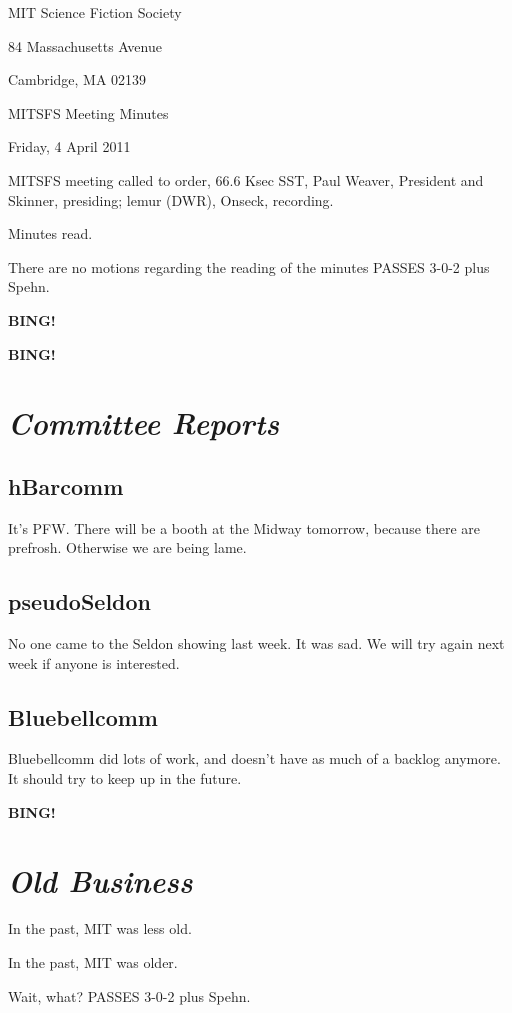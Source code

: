 \documentclass[10pt]{article}
\newcommand{\bing}{{\bf BING!} }
\newcommand{\goto}[1]{\bing \vskip 12pt \section*{{\em{#1}}}}
\newcommand{\ps}{ plus Spehn\xspace}
\newcommand{\skinner}{Paul Weaver, President and Skinner}
\newcommand{\onseck}{lemur (DWR), Onseck}
\newcommand{\meetingdate}{Friday, 4 April 2011}
\begin{document}
\begin{center}

MIT Science Fiction Society

84 Massachusetts Avenue

Cambridge, MA 02139

\vspace{12pt}

MITSFS Meeting Minutes

\meetingdate

\end{center}

\vspace{18pt}

\setlength{\parskip}{6pt}

\noindent
MITSFS meeting called to order, 66.6 Ksec SST,
\skinner, presiding; \onseck, recording.

Minutes read.

There are no motions regarding the reading of the minutes PASSES
3-0-2\ps.

\bing

\goto{Committee Reports}

\subsection*{hBarcomm}

It's PFW.  There will be a booth at the Midway tomorrow, because
there are prefrosh.  Otherwise we are being lame.

\subsection*{pseudoSeldon}

No one came to the Seldon showing last week.  It was sad.  We will
try again next week if anyone is interested.

\subsection*{Bluebellcomm}

Bluebellcomm did lots of work, and doesn't have as much of a backlog
anymore.  It should try to keep up in the future.


\goto{Old Business}

In the past, MIT was less old.

In the past, MIT was older.

Wait, what? PASSES 3-0-2\ps.
\end{document}

